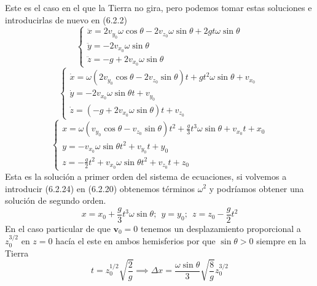 Este es el caso en el que la Tierra no gira, pero podemos tomar estas soluciones e introducirlas de nuevo en (6.2.2)
\begin{equation} \label{6.1.1}
    \left\{\begin{matrix}
      \ddot{x} = 2 v_{y_0} \omega\cos\theta -2 v_{z_0}\omega\sin\theta + 2 gt \omega\sin\theta\\
      \ddot{y} = -2 v_{x_0} \omega \sin\theta \phantom{----------,,}\\
      \ddot{z} = -g +2 v_{x_0} \omega \sin\theta \phantom{---------}
    \end{matrix}\right. 
\end{equation} 
\begin{equation} \label{6.1.1}
    \left\{\begin{matrix}
      \dot{x} = \omega\left(2 v_{y_0} \cos\theta -2 v_{z_0}\sin\theta\right)t +  gt^2 \omega\sin\theta + v_{x_0}\\
      \dot{y} = -2 v_{x_0} \omega \sin\theta t + v_{y_0} \phantom{-----------,}\\
      \dot{z} = \left(-g +2 v_{x_0} \omega \sin\theta\right)t + v_{z_0} \phantom{--------,,}
    \end{matrix}\right. 
\end{equation} 
\begin{equation} \label{6.1.1}
    \left\{\begin{matrix}
        x = \omega\left( v_{y_0} \cos\theta - v_{z_0}\sin\theta\right)t^2 +  \frac{g}{3}t^3 \omega\sin\theta + v_{x_0}t + x_0\\
        y = -v_{x_0} \omega \sin\theta t^2 + v_{y_0}t + y_0 \phantom{-----------}\\
        z = -\frac{g}{2}t^2 + v_{x_0} \omega \sin\theta t^2 + v_{z_0}t+z_0 \phantom{--------,,}
    \end{matrix}\right. 
\end{equation} 
Esta es la solución a primer orden del sistema de ecuaciones, si volvemos a introducir (6.2.24) en (6.2.20) obtenemos términos $\omega^2$ y podríamos obtener una solución de segundo orden.
\begin{equation} \label{6.1.1}
    x =  x_0 + \frac{g}{3}t^3 \omega\sin\theta; \ \ y = y_0; \ \ z =z_0-\frac{g}{2}t^2 
\end{equation} 
En el caso particular de que $\mathbf{v}_0 = 0$ tenemos un desplazamiento proporcional a $z_0^{3/2}$ en $z=0$ hacía el este en ambos hemisferios por que $\sin\theta >0$ siempre en la Tierra 
\begin{equation} \label{6.1.1}
    t = z_0^{1/2} \sqrt{\frac{2}{g}} \implies \Delta x = \frac{ \omega \sin\theta}{3} \sqrt{\frac{8}{g}} z_0^{3/2}
\end{equation} 
\vspace{-15}

